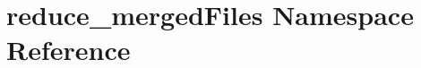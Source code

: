\hypertarget{namespacereduce__mergedFiles}{
\section{reduce\_\-mergedFiles Namespace Reference}
\label{namespacereduce__mergedFiles}
}
